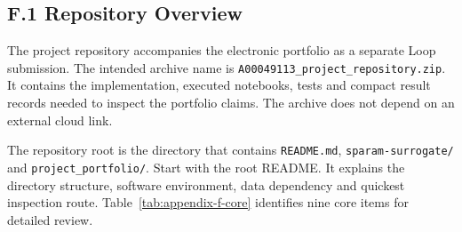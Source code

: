 \providecommand{\PortfolioAppendixPageStyle}{}
\providecommand{\PortfolioContentPageCommand}{}

\onecolumn
\PortfolioAppendixPageStyle
\PortfolioContentPageCommand
{}
{}
\subsection*{F.1 Repository Overview}
\label{app:f-overview}

The project repository accompanies the electronic portfolio as a separate Loop
submission. The intended archive name is
\nolinkurl{A00049113_project_repository.zip}. It contains the implementation,
executed notebooks, tests and compact result records needed to inspect the
portfolio claims. The archive does not depend on an external cloud link.

The repository root is the directory that contains \nolinkurl{README.md},
\nolinkurl{sparam-surrogate/} and \nolinkurl{project_portfolio/}. Start with the
root README. It explains the directory structure, software environment, data
dependency and quickest inspection route. Table~\ref{tab:appendix-f-core}
identifies nine core items for detailed review.


